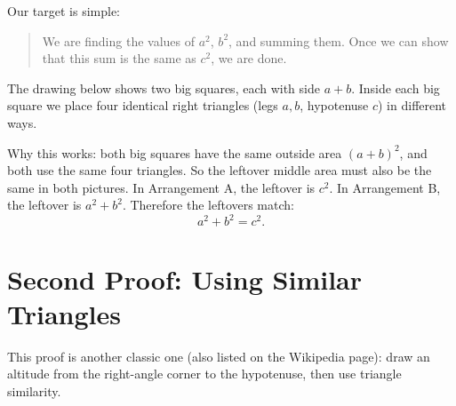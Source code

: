 Our target is simple:
\begin{quote}
We are finding the values of \(a^2\), \(b^2\), and summing them. Once we can
show that this sum is the same as \(c^2\), we are done.
\end{quote}

\noindent
The drawing below shows two big squares, each with side \(a+b\). Inside each
big square we place four identical right triangles (legs \(a,b\), hypotenuse
\(c\)) in different ways.

\begin{center}
\end{center}

\noindent
Why this works: both big squares have the same outside area \((a+b)^2\), and
both use the same four triangles. So the leftover middle area must also be the
same in both pictures. In Arrangement A, the leftover is \(c^2\). In
Arrangement B, the leftover is \(a^2+b^2\). Therefore the leftovers match:
\[
a^2+b^2=c^2.
\]

\section{Second Proof: Using Similar Triangles}
This proof is another classic one (also listed on the Wikipedia page): draw an
altitude from the right-angle corner to the hypotenuse, then use triangle
similarity.

